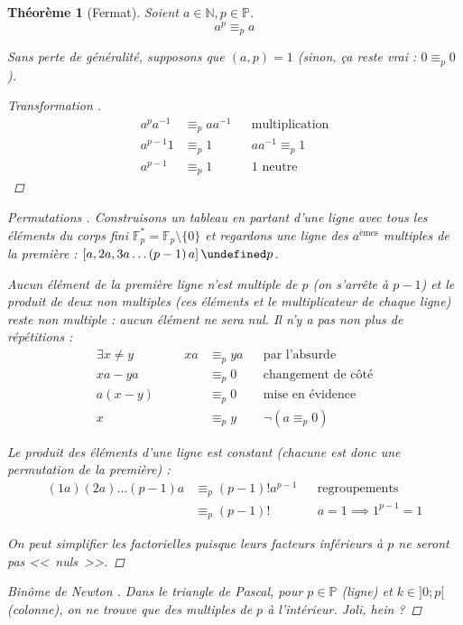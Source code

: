 \documentclass[11pt,twocolumn]{article}
\let\mod\undefined
\DeclareMathOperator{\mod}{mod}
\theoremstyle{plain}
\newtheorem{thm}{Théorème}
\newcommand{\esP}{\mathbb{P}} %
\newcommand{\esN}{\mathbb{N}} %
\newcommand{\esF}{\mathbb{F}} %
\begin{document}
\begin{thm}[Fermat]\label{thm:fermat}
	Soient $a \in \esN, p \in \esP$. \[
		a^p \equiv_p a
	\]

	Sans perte de généralité, supposons que $(a,p)=1$
	(sinon, ça reste vrai : $0 \equiv_p 0$).
	\begin{proof}[Transformation \cite{Gillis}]
		\begin{align*}
			a^pa^{-1} & \equiv_p aa^{-1} && \text{multiplication} \\
			a^{p-1}1 & \equiv_p 1 && aa^{-1} \equiv_p 1 \\
			a^{p-1} & \equiv_p 1 && 1 \text{ neutre}
		\end{align*}
	\end{proof}
	\begin{proof}[Permutations \cite{Buys}]
		Construisons un tableau en partant d'une ligne avec tous les éléments
		du corps fini $\esF_p^* = \esF_p \setminus \{0\}$ et regardons une
		ligne des $a^{\text{èmes}}$ multiples de la première :
		$\left[a, 2a, 3a \dots \left(p-1\right)a\right] \mod p$.

		Aucun élément de la première ligne n'est multiple de $p$ (on s'arrête à
		$p-1$) et le produit de deux non multiples (ces éléments et le
		multiplicateur de chaque ligne) reste non multiple : aucun élément ne
		sera nul. Il n'y a pas non plus de répétitions :
		\begin{align*}
			\exists x \neq y \qquad\qquad
			xa & \equiv_p ya && \text{par l'absurde} \\
			xa - ya & \equiv_p 0 && \text{changement de côté} \\
			a \left(x - y\right) & \equiv_p 0 && \text{mise en évidence} \\
			x & \equiv_p y && \lnot \left(a \equiv_p 0\right)
		\end{align*}

		Le produit des éléments d'une ligne est constant (chacune est donc une
		permutation de la première) :
		\begin{align*}
			(1a)(2a)\dots\left(p-1\right)a
			& \equiv_p \left(p-1\right)!a^{p-1} && \text{regroupements} \\
			& \equiv_p \left(p-1\right)! && a=1 \implies 1^{p-1} = 1
		\end{align*}

		On peut simplifier les factorielles puisque
		leurs facteurs inférieurs à $p$ ne seront pas <<~nuls~>>.
	\end{proof}
	\begin{proof}[Binôme de Newton \cite{Buys}]
		Dans le triangle de Pascal, pour $p \in \esP$ (ligne) et
		$k \in ]0;p[$ (colonne), on ne trouve que des multiples de $p$
		à l'intérieur. \emph{Joli, hein ?}


\end{proof}
\end{thm}
\end{document}
